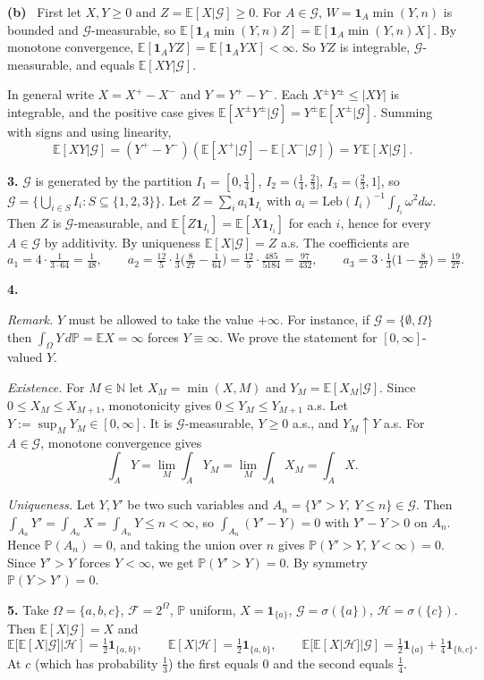 \documentclass[11pt,a4paper]{article}
\newcommand{\E}{\mathbb{E}}
\renewcommand{\P}{\mathbb{P}}
\newcommand{\N}{\mathbb{N}}
\newcommand{\F}{\mathcal{F}}
\newcommand{\G}{\mathcal{G}}
\newcommand{\Hc}{\mathcal{H}}
\newcommand{\1}{\mathbf{1}}
\newcommand{\Leb}{\mathrm{Leb}}
\newcommand{\prob}[1]{\par\medskip\noindent\textbf{#1}\quad}
\newcommand{\sub}[1]{\par\smallskip\noindent\textbf{#1}\ }
\newcommand{\note}[1]{\par\noindent\emph{Remark.} #1}
\begin{document}
\sub{(b)} First let $X,Y\ge0$ and $Z=\E[X|\G]\ge0$. For $A\in\G$, $W=\1_A\min(Y,n)$ is bounded and
$\G$-measurable, so $\E[\1_A\min(Y,n)Z]=\E[\1_A\min(Y,n)X]$. By monotone convergence,
$\E[\1_AYZ]=\E[\1_AYX]<\infty$. So $YZ$ is integrable, $\G$-measurable, and equals $\E[XY|\G]$.

In general write $X=X^+-X^-$ and $Y=Y^+-Y^-$. Each $X^\pm Y^\pm\le|XY|$ is integrable, and the
positive case gives $\E[X^\pm Y^\pm|\G]=Y^\pm\E[X^\pm|\G]$. Summing with signs and using linearity,
\[\E[XY|\G]=(Y^+-Y^-)(\E[X^+|\G]-\E[X^-|\G])=Y\,\E[X|\G].\]

\prob{3.}
$\G$ is generated by the partition $I_1=[0,\frac14]$, $I_2=(\frac14,\frac23]$, $I_3=(\frac23,1]$, so
$\G=\{\bigcup_{i\in S}I_i:S\subseteq\{1,2,3\}\}$. Let $Z=\sum_ia_i\1_{I_i}$ with
$a_i=\Leb(I_i)^{-1}\int_{I_i}\omega^2d\omega$. Then $Z$ is $\G$-measurable, and $\E[Z\1_{I_i}]=\E[X\1_{I_i}]$ for each $i$, hence for
every $A\in\G$ by additivity. By uniqueness $\E[X|\G]=Z$ a.s. The coefficients are
\[
a_1=4\cdot\tfrac{1}{3\cdot64}=\tfrac1{48},\qquad
a_2=\tfrac{12}{5}\cdot\tfrac13\Big(\tfrac{8}{27}-\tfrac1{64}\Big)=\tfrac{12}{5}\cdot\tfrac{485}{5184}=\tfrac{97}{432},\qquad
a_3=3\cdot\tfrac13\Big(1-\tfrac{8}{27}\Big)=\tfrac{19}{27}.
\]

\prob{4.}
\note{$Y$ must be allowed to take the value $+\infty$. For instance, if $\G=\{\emptyset,\Omega\}$ then
$\int_\Omega Y\,d\P=\E X=\infty$ forces $Y\equiv\infty$. We prove the statement for $[0,\infty]$-valued $Y$.}

\emph{Existence.} For $M\in\N$ let $X_M=\min(X,M)$ and $Y_M=\E[X_M|\G]$. Since $0\le X_M\le X_{M+1}$, monotonicity gives
$0\le Y_M\le Y_{M+1}$ a.s. Let $Y:=\sup_MY_M\in[0,\infty]$. It is $\G$-measurable, $Y\ge0$ a.s., and $Y_M\uparrow Y$ a.s. For $A\in\G$, monotone convergence gives
\[\int_AY=\lim_M\int_AY_M=\lim_M\int_AX_M=\int_AX.\]

\emph{Uniqueness.} Let $Y,Y'$ be two such variables and $A_n=\{Y'>Y,\ Y\le n\}\in\G$. Then
$\int_{A_n}Y'=\int_{A_n}X=\int_{A_n}Y\le n<\infty$, so $\int_{A_n}(Y'-Y)=0$ with $Y'-Y>0$ on $A_n$. Hence
$\P(A_n)=0$, and taking the union over $n$ gives $\P(Y'>Y,\,Y<\infty)=0$. Since $Y'>Y$ forces $Y<\infty$, we get $\P(Y'>Y)=0$.
By symmetry $\P(Y>Y')=0$.

\prob{5.}
Take $\Omega=\{a,b,c\}$, $\F=2^\Omega$, $\P$ uniform, $X=\1_{\{a\}}$, $\G=\sigma(\{a\})$, $\Hc=\sigma(\{c\})$. Then
$\E[X|\G]=X$ and
\[
\E[\E[X|\G]|\Hc]=\tfrac12\1_{\{a,b\}},\qquad
\E[X|\Hc]=\tfrac12\1_{\{a,b\}},\qquad \E[\E[X|\Hc]|\G]=\tfrac12\1_{\{a\}}+\tfrac14\1_{\{b,c\}}.
\]
At $c$ (which has probability $\frac13$) the first equals $0$ and the second equals $\frac14$.
\end{document}
